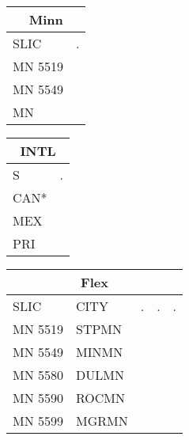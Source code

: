 \documentclass{article}
\begin{document}
\begin{minipage}{0.5\textwidth}
\fontsize{30}{36}\selectfont
\begin{tabular}[t]{ll}
\multicolumn{2}{c}{Minn} \\
\toprule
SLIC                 & .    \\ \midrule
MN 5519 & \cellcolor{blue}   \\
MN 5549 & \cellcolor{blue}   \\
MN      & \cellcolor{yellow} \\ \bottomrule
\end{tabular}
\hspace{0.1cm}
\begin{tabular}[t]{ll}
\multicolumn{2}{c}{INTL} \\
\toprule
S                 & .    \\ \midrule
CAN* & \cellcolor{red}  \\
MEX  & \cellcolor{blue} \\
PRI  & \cellcolor{red} \\ \bottomrule
\end{tabular}
\vspace{1ex}

\begin{tabular}[t]{l|ll|l|l}
\multicolumn{5}{c}{\textbf{Flex}} \\
\toprule
SLIC    & CITY  & .                   & .                   &    .             \\ \midrule
MN 5519 & STPMN & \cellcolor{blue}   & \cellcolor{red}    &                 \\
MN 5549 & MINMN & \cellcolor{blue}   & \cellcolor{yellow} & \cellcolor{red} \\
MN 5580 & DULMN & \cellcolor{yellow} & \cellcolor{red}    &                 \\
MN 5590 & ROCMN & \cellcolor{yellow} & \cellcolor{red}    &                 \\
MN 5599 & MGRMN & \cellcolor{yellow} & \cellcolor{red}    &                 \\ \bottomrule
\end{tabular}
\end{minipage}


\end{document}

